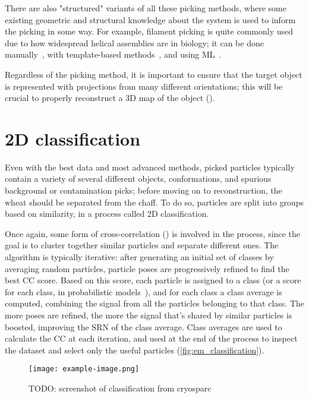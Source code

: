 There are also "structured" variants of all these picking methods, where some existing geometric and structural knowledge about the system is used to inform the picking in some way.
For example, filament picking is quite commonly used due to how widespread helical assemblies are in biology; it can be done manually~\cite{scheresRELIONImplementationBayesian2012,heHelicalReconstructionRELION2017}, with template-based methods~\cite{punjaniCryoSPARCAlgorithmsRapid2017}, and using ML~\cite{wagnerSPHIREcrYOLOFastAccurate2019,wagnerEvolutionSPHIREcrYOLOParticle2020}.

Regardless of the picking method, it is important to ensure that the target object is represented with projections from many different orientations; this will be crucial to properly reconstruct a 3D map of the object ().

\section{2D classification}\label{em_classification}

Even with the best data and most advanced methods, picked particles typically contain a variety of several different objects, conformations, and spurious background or contamination picks; before moving on to reconstruction, the wheat should be separated from the chaff.
To do so, particles are split into groups based on similarity, in a process called 2D classification.

Once again, some form of cross-correlation () is involved in the process, since the goal is to cluster together similar particles and separate different ones.
The algorithm is typically iterative: after generating an initial set of classes by averaging random particles, particle poses are progressively refined to find the best CC score.
Based on this score, each particle is assigned to a class (or a score for each class, in probabilistic models~\cite{scheresRELIONImplementationBayesian2012}), and for each class a class average is computed, combining the signal from all the particles belonging to that class. The more poses are refined, the more the signal that's shared by similar particles is boosted, improving the SRN of the class average.
Class averages are used to calculate the CC at each iteration, and used at the end of the process to inspect the dataset and select only the useful particles (\autoref{fig:em_classification}).

\begin{figure}[ht]
    \centering
    \texttt{[image: example-image.png]}
    \caption{TODO: screenshot of classification from cryosparc}
    \label{fig:em_classification}
\end{figure}

